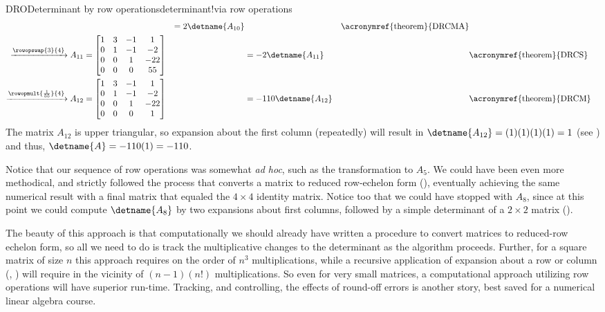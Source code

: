 \begin{example}{DRO}{Determinant by row operations}{determinant!via row operations}
\begin{align*}
&
&=2\detname{A_{10}}&&\text{\acronymref{theorem}{DRCMA}}\\
\xrightarrow{\rowopswap{3}{4}}
A_{11}&=
\begin{bmatrix}
1 & 3 &-1 & 1 \\
0 & 1 &-1 &-2 \\
0 & 0 & 1 &-22\\
0 & 0 & 0 &55 
\end{bmatrix}
&
&=-2\detname{A_{11}}&&\text{\acronymref{theorem}{DRCS}}\\
\xrightarrow{\rowopmult{\frac{1}{55}}{4}}
A_{12}&=
\begin{bmatrix}
1 & 3 &-1 & 1 \\
0 & 1 &-1 &-2 \\
0 & 0 & 1 &-22\\
0 & 0 & 0 & 1 
\end{bmatrix}
&
&=-110\detname{A_{12}}&&\text{\acronymref{theorem}{DRCM}}\\
\end{align*}
%
The matrix $A_{12}$ is upper triangular, so expansion about the first column (repeatedly) will result in $\detname{A_{12}}=(1)(1)(1)(1)=1$ (see ) and thus, $\detname{A}=-110(1)=-110$.\par
%
Notice that our sequence of row operations was somewhat {\it ad hoc}, such as the transformation to $A_5$.  We could have been even more methodical, and strictly followed the process that converts a matrix to reduced row-echelon form (), eventually achieving the same numerical result with a final matrix that equaled the $4\times 4$ identity matrix.  Notice too that we could have stopped with $A_8$, since at this point we could compute $\detname{A_8}$ by two expansions about first columns, followed by a simple determinant of a $2\times 2$ matrix ().\par
%
The beauty of this approach is that computationally we should already have written a procedure to convert matrices to reduced-row echelon form, so all we need to do is track the multiplicative changes to the determinant as the algorithm proceeds.   Further, for a square matrix of size $n$ this approach requires on the order of $n^3$ multiplications, while a recursive application of expansion about a row or column (, ) will require in the vicinity of $(n-1)(n!)$ multiplications.  So even for very small matrices, a computational approach utilizing row operations will have superior run-time.  Tracking, and controlling, the effects of round-off errors is another story, best saved for a numerical linear algebra course.
%
\end{example}
